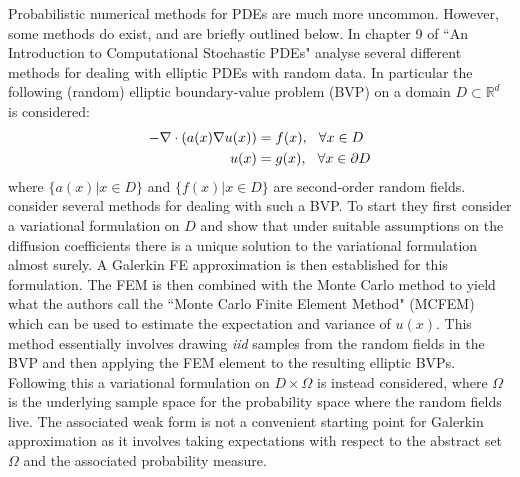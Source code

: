 Probabilistic numerical methods for PDEs are much more uncommon. However, some methods do exist, and are briefly outlined below. In chapter 9 of ``An Introduction to Computational Stochastic PDEs" \textcolor{blue}{\citeauthor{lord2014introduction}} analyse several different methods for dealing with elliptic PDEs with random data. In particular the following (random) elliptic boundary-value problem (BVP) on a domain $D\subset\mathbb{R}^d$ is considered:
\begin{align*}
-\nabla \cdot(a(x) \nabla u(x)) &=f(x), \hspace{0.25cm} \forall x \in D \\
u(x) &=g(x), \hspace{0.25cm} \forall x \in \partial D
\end{align*}
where $\{a(x)|x\in D\}$ and $\{f(x)|x\in D\}$ are second-order random fields. \textcolor{blue}{\citeauthor{lord2014introduction}} consider several methods for dealing with such a BVP. To start they first consider a variational formulation on $D$ and show that under suitable assumptions on the diffusion coefficients there is a unique solution to the variational formulation almost surely. A Galerkin FE approximation is then established for this formulation.
The FEM is then combined with the Monte Carlo method to yield what the authors call the ``Monte Carlo Finite Element Method" (MCFEM) which can be used to estimate the expectation and variance of $u(x)$. This method essentially involves drawing \textit{iid} samples from the random fields in the BVP and then applying the FEM element to the resulting elliptic BVPs. Following this a variational formulation on $D\times\Omega$ is instead considered, where $\Omega$ is the underlying sample space for the probability space where the random fields live. The associated weak form is not a convenient starting point for Galerkin approximation as it involves taking expectations with respect to the abstract set $\Omega$ and the associated probability measure.

